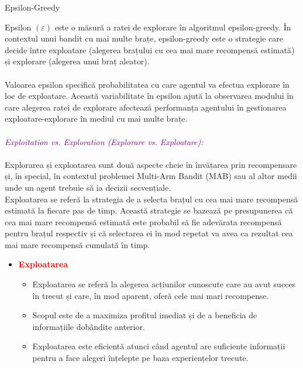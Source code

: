 \documentclass{article}
\begin{document}
\begin{algorithm}
\caption{Epsilon-Greedy}

\end{algorithm}
Epsilon $(\varepsilon)$ este o măsură a ratei de explorare în algoritmul epsilon-greedy. În contextul unui bandit cu mai multe brațe, epsilon-greedy este o strategie care decide între exploatare (alegerea brațului cu cea mai mare recompensă estimată) și explorare (alegerea unui braț aleator).\\\\
Valoarea epsilon specifică probabilitatea cu care agentul va efectua explorare în loc de exploatare. Această variabilitate în epsilon ajută la observarea modului în care alegerea ratei de explorare afectează performanța agentului în gestionarea exploatare-explorare în mediul cu mai multe brațe.\\\\
\textcolor{purple}{\itshape{Exploitation vs. Exploration (Explorare vs. Exploatare):}}\\\\
Explorarea și exploatarea sunt două aspecte cheie în învățarea prin recompensare și, în special, în contextul problemei Multi-Arm Bandit (MAB) sau al altor medii unde un agent trebuie să ia decizii secvențiale.\\
Exploatarea se referă la strategia de a selecta brațul cu cea mai mare recompensă estimată la fiecare pas de timp. Această strategie se bazează pe presupunerea că cea mai mare recompensă estimată este probabil să fie adevărata recompensă pentru brațul respectiv și că selectarea ei în mod repetat va avea ca rezultat cea mai mare recompensă cumulată în timp.
\begin{itemize}
 \item \textbf{\textcolor{red}{Exploatarea}} 
    \begin{itemize}
        \item Exploatarea se referă la alegerea acțiunilor cunoscute care au avut succes în trecut și care, în mod aparent, oferă cele mai mari recompense.
        \item Scopul este de a maximiza profitul imediat și de a beneficia de informațiile dobândite anterior.
        \item Exploatarea este eficientă atunci când agentul are suficiente informații pentru a face alegeri înțelepte pe baza experiențelor trecute.
    \end{itemize}
\end{itemize}
\end{document}

